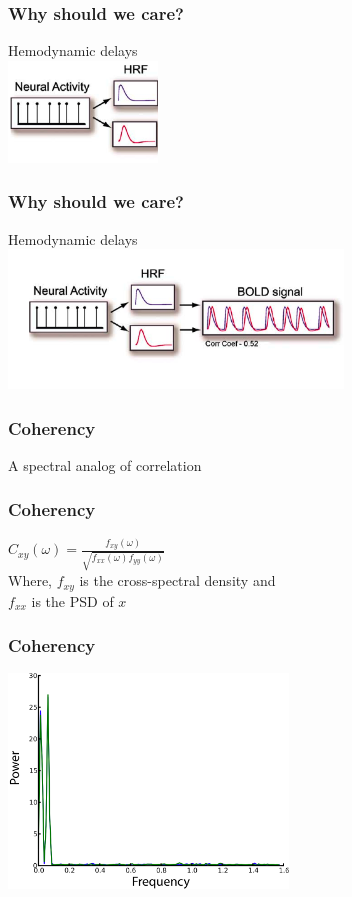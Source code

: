 \documentclass{beamer}
\begin{document}
\begin{frame}
\frametitle{Why should we care? }
Hemodynamic delays
\\
\includegraphics[height=2.7cm]{figures/hemo}
\end{frame}

\begin{frame}
\frametitle{Why should we care?}
Hemodynamic delays
\\
\includegraphics[height=3.7cm]{figures/tseries_w_hemo}
\end{frame}

\begin{frame}
\frametitle{Coherency}
A spectral analog of correlation
\end{frame}

\begin{frame}
\frametitle{Coherency}
$C_{xy}(\omega) = \frac{f_{xy}(\omega)}{\sqrt{f_{xx}(\omega)f_{yy}(\omega)}}$
\pause
\\
\vfill
Where, $f_{xy}$ is the cross-spectral density and 
\\
$f_{xx}$ is the PSD of $x$
\end{frame}

\begin{frame}
\frametitle{Coherency}
\includegraphics[height=5.7cm]{figures/outa_phase_tseries_psd}
\end{frame}
\end{document}

